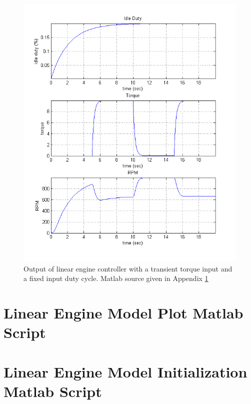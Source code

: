 \documentclass{article}
\begin{document}
\begin{figure}
\begin{center}
\includegraphics[scale=0.8]{img/linear_engine_model_no_control_plot}
\end{center}
\caption{Output of linear engine controller with a transient torque
input and a fixed input duty cycle.  Matlab source given in
Appendix \ref{app:olplot}}
\label{fig:olplot}
\end{figure}

\clearpage
\printbibliography[heading=bibintoc]

\clearpage
\appendix

\section{Linear Engine Model Plot Matlab Script}
\label{app:olplot}


\section{Linear Engine Model Initialization Matlab Script}

\end{document}
